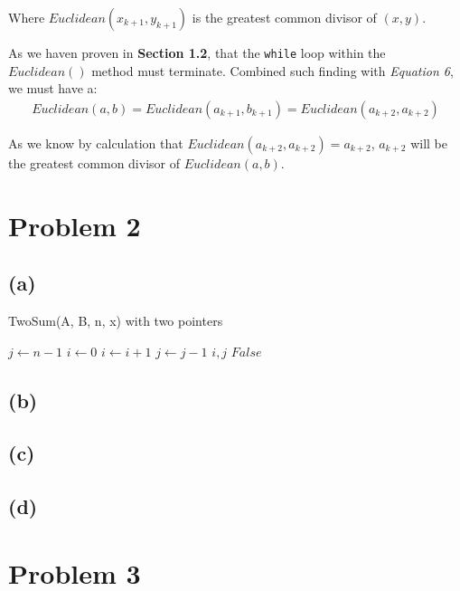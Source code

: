 \documentclass[12pt]{article}
\newcommand{\inlinecode}{\texttt}
\begin{document}
Where $Euclidean(x_{k+1}, y_{k+1})$ is the greatest common divisor of $(x, y)$.\newline


As we haven proven in \textbf{Section 1.2}, that the \inlinecode{while} loop within the $Euclidean()$ method must terminate. Combined such finding with \textit{Equation 6}, we must have a:
\begin{gather}
    Euclidean(a, b) = Euclidean(a_{k+1}, b_{k+1}) = Euclidean(a_{k+2}, a_{k+2})
\end{gather}

As we know by calculation that $Euclidean(a_{k+2}, a_{k+2}) = a_{k+2}$, $a_{k+2}$ will be the greatest common divisor of $Euclidean(a, b)$.

\section{Problem 2}
\subsection{(a)}

\begin{algorithm}
\caption{TwoSum(A, B, n, x) with two pointers}\label{TwoSum}
\begin{algorithmic}[1]
\Procedure{}{}
\State $j \gets n-1$
\State $i \gets 0$
        \State $i \gets i + 1$
        \State $j \gets j - 1$
    \Else
        \State \Return $i, j$
    \EndIf
\EndWhile
\State \Return $False$
\EndProcedure
\end{algorithmic}
\end{algorithm}



\subsection{(b)}
\subsection{(c)}
\subsection{(d)}

\section{Problem 3}


%
% 
% 
\end{document}
